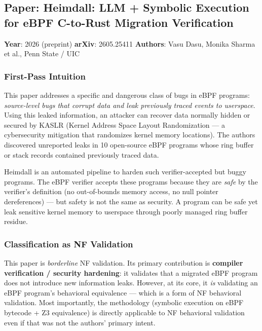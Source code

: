 \documentclass[12pt, a4paper]{article}
\begin{document}
\subsection*{Paper: Heimdall: LLM + Symbolic Execution for eBPF C-to-Rust Migration Verification}
\textbf{Year}: 2026 (preprint) \quad \textbf{arXiv}: 2605.25411 \quad \textbf{Authors}: Vasu Dasu, Monika Sharma et al., Penn State / UIC

\subsubsection{First-Pass Intuition}

This paper addresses a specific and dangerous class of bugs in eBPF programs: \emph{source-level bugs that corrupt data and leak previously traced events to userspace}. Using this leaked information, an attacker can recover data normally hidden or secured by KASLR (Kernel Address Space Layout Randomization --- a cybersecurity mitigation that randomizes kernel memory locations). The authors discovered unreported leaks in 10 open-source eBPF programs whose ring buffer or stack records contained previously traced data.

Heimdall is an automated pipeline to harden such verifier-accepted but buggy programs. The eBPF verifier accepts these programs because they are \emph{safe} by the verifier's definition (no out-of-bounds memory access, no null pointer dereferences) --- but safety is not the same as security. A program can be safe yet leak sensitive kernel memory to userspace through poorly managed ring buffer residue.

\subsubsection{Classification as NF Validation}

\begin{insightbox}
This paper is \emph{borderline} NF validation. Its primary contribution is \textbf{compiler verification / security hardening}: it validates that a migrated eBPF program does not introduce new information leaks. However, at its core, it \emph{is} validating an eBPF program's behavioral equivalence --- which is a form of NF behavioral validation. Most importantly, the methodology (symbolic execution on eBPF bytecode + Z3 equivalence) is directly applicable to NF behavioral validation even if that was not the authors' primary intent.
\end{insightbox}
\end{document}
